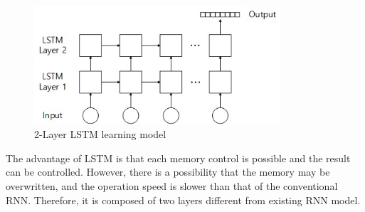 \begin{figure}[t]
\centering
\setlength{\abovecaptionskip}{0pt}
\setlength{\belowcaptionskip}{0pt}
{
\includegraphics[width=3.6in]{fig4.jpg}
\caption{2-Layer LSTM learning model}
\label{fig4}
}
\end{figure}

The advantage of LSTM is that each memory control is possible and the result can be controlled.
However, there is a possibility that the memory may be overwritten, and the operation speed is slower than that of the conventional RNN.
Therefore, it is composed of two layers different from existing RNN model.

